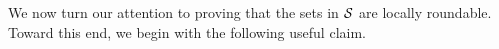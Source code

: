 %
%

\medskip \noindent We now turn our attention to proving that the sets in ${\cal S}$ are locally roundable.
 Toward this end, we begin with the following useful claim.

